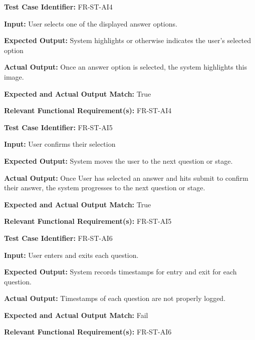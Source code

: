 \documentclass[12pt, titlepage]{article}
\begin{document}
\begin{mdframed}[linewidth=0.5mm] \par
  \textbf{Test Case Identifier:} FR-ST-AI4 \par
  \textbf{Input:} User selects one of the displayed answer options.
  \par
  \textbf{Expected Output:} System highlights or otherwise indicates the user’s selected option \par
  \textbf{Actual Output:} Once an answer option is selected, the system highlights this image. \par 
  \textbf{Expected and Actual Output Match:} True \par
  \textbf{Relevant Functional Requirement(s):} FR-ST-AI4
\end{mdframed}

\begin{mdframed}[linewidth=0.5mm] \par
  \textbf{Test Case Identifier:} FR-ST-AI5 \par
  \textbf{Input:} User confirms their selection
  \par
  \textbf{Expected Output:}  System moves the user to the next question or stage. \par
  \textbf{Actual Output:} Once User has selected an answer and hits submit to confirm their answer, 
  the system progresses to the next question or stage. \par
  \textbf{Expected and Actual Output Match:} True \par
  \textbf{Relevant Functional Requirement(s):} FR-ST-AI5
\end{mdframed}

\begin{mdframed}[linewidth=0.5mm] \par
  \textbf{Test Case Identifier:} FR-ST-AI6 \par
  \textbf{Input:} User enters and exits each question.
  \par
  \textbf{Expected Output:} System records timestamps for entry and exit for each question. \par
  \textbf{Actual Output:} Timestamps of each question are not properly logged. \par
  \textbf{Expected and Actual Output Match:} Fail  \par
  \textbf{Relevant Functional Requirement(s):}  FR-ST-AI6 
\end{mdframed}
\end{document}
